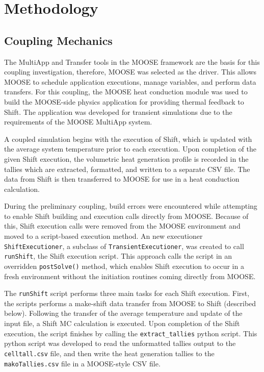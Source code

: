\documentclass{anstrans}
\begin{document}
\section{Methodology}
 
\subsection{Coupling Mechanics}
The MultiApp and Transfer tools in the MOOSE framework are the basis for this coupling investigation, therefore, MOOSE was selected as the driver. This allows MOOSE to schedule application executions, manage variables, and perform data transfers. For this coupling, the MOOSE heat conduction module was used to build the MOOSE-side physics application for providing thermal feedback to Shift. The application was developed for transient simulations due to the requirements of the MOOSE MultiApp system.

A coupled simulation begins with the execution of Shift, which is updated with the average system temperature prior to each execution. Upon completion of the given Shift execution, the volumetric heat generation profile is recorded in the tallies which are extracted, formatted, and written to a separate CSV file. The data from Shift is then transferred to MOOSE for use in a heat conduction calculation.

During the preliminary coupling, build errors were encountered while attempting to enable Shift building and execution calls directly from MOOSE. Because of this, Shift execution calls were removed from the MOOSE environment and moved to a script-based execution method. An new executioner \texttt{ShiftExecutioner}, a subclass of \texttt{TransientExecutioner}, was created to call \texttt{runShift}, the Shift execution script. This approach calls the script in an overridden \texttt{postSolve()} method, which enables Shift execution to occur in a fresh environment without the initiation routines coming directly from MOOSE. 

The \texttt{runShift} script performs three main tasks for each Shift execution. First, the scripts performs a make-shift data transfer from MOOSE to Shift (described below). Following the transfer of the average temperature and update of the input file, a Shift MC calculation is executed. Upon completion of the Shift execution, the script finishes by calling the \texttt{extract\_tallies} python script. This python script was developed to read the unformatted tallies output to the \texttt{celltall.csv} file, and then write the heat generation tallies to the \texttt{makoTallies.csv} file in a MOOSE-style CSV file.
\end{document}
